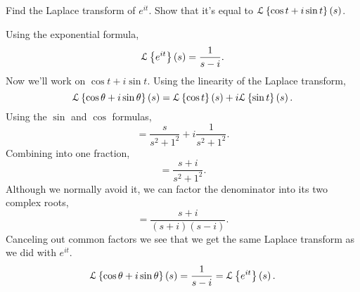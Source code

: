 \begin{example}
	Find the Laplace transform of $e^{it}$. Show that it's equal to $\mathcal{L}\left\{ \cos{t} + i\sin{t} \right\}\left(s\right)$.
\end{example}
Using the exponential formula,
\begin{equation*}
	\mathcal{L}\left\{ e^{it} \right\}\left(s\right) = \frac{1}{s - i}.
\end{equation*}
Now we'll work on $\cos{t} + i\sin{t}$.
Using the linearity of the Laplace transform,
\begin{equation*}
	\mathcal{L}\left\{ \cos{\theta} + i\sin{\theta} \right\}\left(s\right) = \mathcal{L}\left\{ \cos{t} \right\}\left(s\right) + i\mathcal{L}\left\{ \sin{t} \right\}\left(s\right).
\end{equation*}
Using the $\sin$ and $\cos$ formulas,
\begin{equation*}
	= \frac{s}{s^2 + 1^2} + i\frac{1}{s^2 + 1^2}.
\end{equation*}
Combining into one fraction,
\begin{equation*}
	= \frac{s+i}{s^2 + 1^2}.
\end{equation*}
Although we normally avoid it, we can factor the denominator into its two complex roots,
\begin{equation*}
	= \frac{s+i}{(s+i)(s-i)}.
\end{equation*}
Canceling out common factors we see that we get the same Laplace transform as we did with $e^{it}$.
\begin{equation*}
	\mathcal{L}\left\{ \cos{\theta} + i\sin{\theta} \right\}\left(s\right) = \frac{1}{s-i} = \mathcal{L}\left\{ e^{it} \right\}\left(s\right).
\end{equation*}
